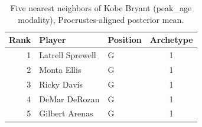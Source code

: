 \begin{table}[htbp]
  \centering\small
  \begin{tabular}{rllc}
    \toprule
    Rank & Player & Position & Archetype \\
    \midrule
    1 & Latrell Sprewell & G & 1 \\
    2 & Monta Ellis & G & 1 \\
    3 & Ricky Davis & G & 1 \\
    4 & DeMar DeRozan & G & 1 \\
    5 & Gilbert Arenas & G & 1 \\
    \bottomrule
  \end{tabular}
  \caption{Five nearest neighbors of Kobe Bryant (peak_age modality), Procrustes-aligned posterior mean.}
  \label{tab:Kobe_Bryant_neighbors_peak_age}
\end{table}

